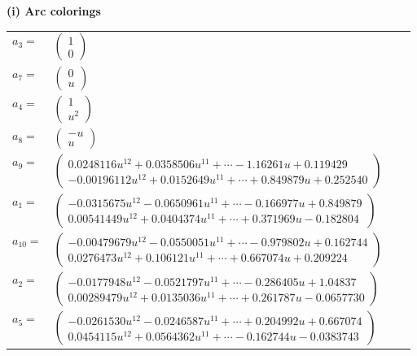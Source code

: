 \documentclass[1p]{elsarticle_modified}
\theoremstyle{definition}
\begin{document}
\flushleft \textbf{(i) Arc colorings}\\
\begin{tabular}{m{7pt} m{180pt} m{7pt} m{180pt} }
\flushright $a_{3}=$&$\begin{pmatrix}1\\0\end{pmatrix}$ \\
\flushright $a_{7}=$&$\begin{pmatrix}0\\u\end{pmatrix}$ \\
\flushright $a_{4}=$&$\begin{pmatrix}1\\u^2\end{pmatrix}$ \\
\flushright $a_{8}=$&$\begin{pmatrix}- u\\u\end{pmatrix}$ \\
\flushright $a_{9}=$&$\begin{pmatrix}0.0248116 u^{12}+0.0358506 u^{11}+\cdots-1.16261 u+0.119429\\-0.00196112 u^{12}+0.0152649 u^{11}+\cdots+0.849879 u+0.252540\end{pmatrix}$ \\
\flushright $a_{1}=$&$\begin{pmatrix}-0.0315675 u^{12}-0.0650961 u^{11}+\cdots-0.166977 u+0.849879\\0.00541449 u^{12}+0.0404374 u^{11}+\cdots+0.371969 u-0.182804\end{pmatrix}$ \\
\flushright $a_{10}=$&$\begin{pmatrix}-0.00479679 u^{12}-0.0550051 u^{11}+\cdots-0.979802 u+0.162744\\0.0276473 u^{12}+0.106121 u^{11}+\cdots+0.667074 u+0.209224\end{pmatrix}$ \\
\flushright $a_{2}=$&$\begin{pmatrix}-0.0177948 u^{12}-0.0521797 u^{11}+\cdots-0.286405 u+1.04837\\0.00289479 u^{12}+0.0135036 u^{11}+\cdots+0.261787 u-0.0657730\end{pmatrix}$ \\
\flushright $a_{5}=$&$\begin{pmatrix}-0.0261530 u^{12}-0.0246587 u^{11}+\cdots+0.204992 u+0.667074\\0.0454115 u^{12}+0.0564362 u^{11}+\cdots-0.162744 u-0.0383743\end{pmatrix}$ \\

\end{tabular}
\end{document}
